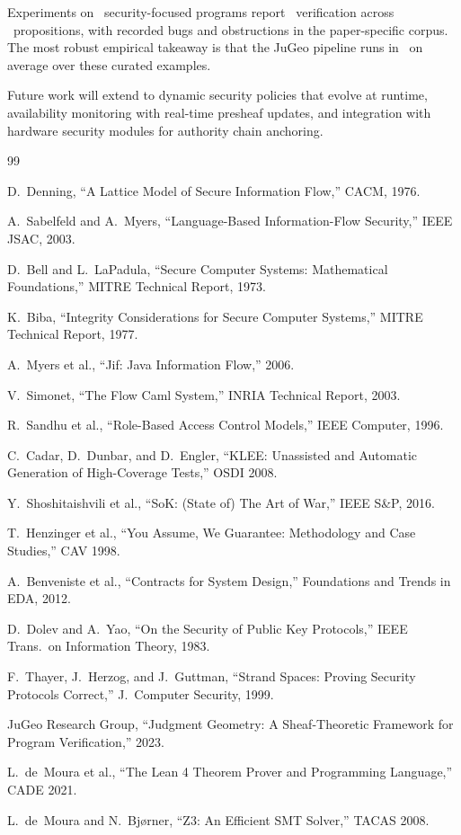 \documentclass[11pt]{article}
\begin{document}
Experiments on \ppLXIXprogramCount\ security-focused programs report
\ppLXIXverifiedPct\ verification across \ppLXIXpropsTotal\ propositions, with
\ppLXIXbugsTotal{} recorded bugs and \ppLXIXobsTotal{} obstructions in the
paper-specific corpus. The most robust empirical takeaway is that the JuGeo
pipeline runs in \ppLXIXtimeMean\ on average over these curated examples.

Future work will extend to dynamic security policies that evolve at
runtime, availability monitoring with real-time presheaf updates, and
integration with hardware security modules for authority chain
anchoring.

\begin{thebibliography}{99}

D.~Denning, ``A Lattice Model of Secure Information Flow,''
CACM, 1976.

A.~Sabelfeld and A.~Myers, ``Language-Based Information-Flow
Security,'' IEEE JSAC, 2003.

D.~Bell and L.~LaPadula, ``Secure Computer Systems: Mathematical
Foundations,'' MITRE Technical Report, 1973.

K.~Biba, ``Integrity Considerations for Secure Computer Systems,''
MITRE Technical Report, 1977.

A.~Myers et al., ``Jif: Java Information Flow,'' 2006.

V.~Simonet, ``The Flow Caml System,'' INRIA Technical Report, 2003.

R.~Sandhu et al., ``Role-Based Access Control Models,''
IEEE Computer, 1996.

C.~Cadar, D.~Dunbar, and D.~Engler, ``KLEE: Unassisted and Automatic
Generation of High-Coverage Tests,'' OSDI 2008.

Y.~Shoshitaishvili et al., ``SoK: (State of) The Art of War,''
IEEE S\&P, 2016.

T.~Henzinger et al., ``You Assume, We Guarantee: Methodology and
Case Studies,'' CAV 1998.

A.~Benveniste et al., ``Contracts for System Design,''
Foundations and Trends in EDA, 2012.

D.~Dolev and A.~Yao, ``On the Security of Public Key Protocols,''
IEEE Trans.\ on Information Theory, 1983.

F.~Thayer, J.~Herzog, and J.~Guttman, ``Strand Spaces: Proving
Security Protocols Correct,'' J.\ Computer Security, 1999.

JuGeo Research Group, ``Judgment Geometry: A Sheaf-Theoretic Framework
for Program Verification,'' 2023.

L.~de~Moura et al., ``The Lean 4 Theorem Prover and Programming
Language,'' CADE 2021.

L.~de~Moura and N.~Bj{\o}rner, ``Z3: An Efficient SMT Solver,''
TACAS 2008.

\end{thebibliography}
\end{document}
